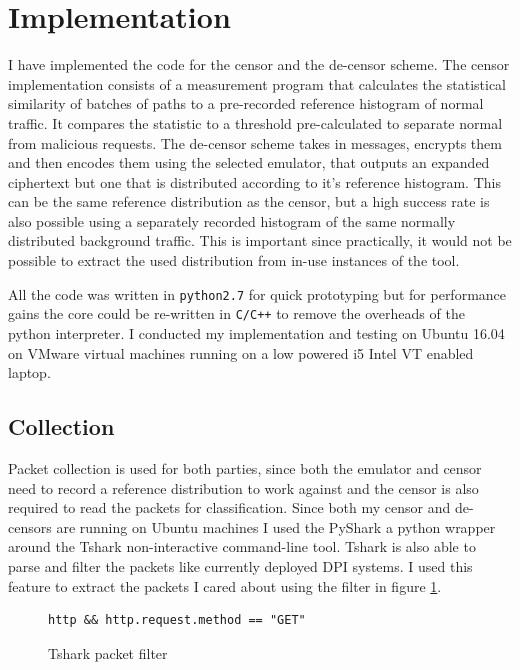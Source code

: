 \documentclass[10pt,a4paper]{article}
\begin{document}
\pagebreak
\section{Implementation}


I have implemented the code for the censor and the de-censor scheme. The censor implementation consists of a measurement program that calculates the statistical similarity of batches of paths to a pre-recorded reference histogram of normal traffic. It compares the statistic to a threshold pre-calculated to separate normal from malicious requests. The de-censor scheme takes in messages, encrypts them and then encodes them using the selected emulator, that outputs an expanded ciphertext but one that is distributed according to it's reference histogram. This can be the same reference distribution as the censor, but a high success rate is also possible using a separately recorded histogram of the same normally distributed background traffic. This is important since practically, it would not be possible to extract the used distribution from in-use instances of the tool.


All the code was written in \texttt{python2.7} for quick prototyping but for performance gains the core could be re-written in \texttt{C/C++} to remove the overheads of the python interpreter. I conducted my implementation and testing on Ubuntu 16.04 on VMware virtual machines running on a low powered i5 Intel VT enabled laptop.

\subsection{Collection}

Packet collection is used for both parties, since both the emulator and censor need to record a reference distribution to work against and the censor is also required to read the packets for classification. Since both my censor and de-censors are running on Ubuntu machines I used the PyShark a python wrapper around the Tshark non-interactive command-line tool. Tshark is also able to parse and filter the packets like currently deployed DPI systems. I used this feature to extract the packets I cared about using the filter in figure \ref{fig:filter}.

\begin{figure}[h]
\begin{verbatim}
http && http.request.method == "GET"
\end{verbatim}
\caption{Tshark packet filter}
\label{fig:filter}
\end{figure}
\end{document}
